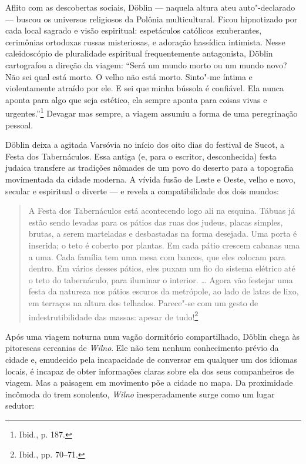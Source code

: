 Aflito com as descobertas sociais, Döblin --- naquela altura ateu
auto"-declarado --- buscou os universos religiosos da Polônia
multicultural. Ficou hipnotizado por cada local sagrado e visão
espiritual: espetáculos católicos exuberantes, cerimônias ortodoxas
russas misteriosas, e adoração hassídica intimista. Nesse caleidoscópio
de pluralidade espiritual frequentemente antagonista, Döblin cartografou
a direção da viagem: ``Será um mundo morto ou um mundo novo? Não sei
qual está morto. O velho não está morto. Sinto"-me íntima e violentamente
atraído por ele. E sei que minha bússola é confiável. Ela nunca aponta
para algo que seja estético, ela sempre aponta para coisas vivas e
urgentes.''\footnote{Ibid., p. 187.} Devagar mas sempre, a viagem
assumiu a forma de uma peregrinação pessoal.

Döblin deixa a agitada Varsóvia no início dos oito dias do festival de
Sucot, a Festa dos Tabernáculos. Essa antiga (e, para o escritor,
desconhecida) festa judaica transfere as tradições nômades de um povo do
deserto para a topografia movimentada da cidade moderna. A vívida fusão
de Leste e Oeste, velho e novo, secular e espiritual o diverte --- e
revela a compatibilidade dos dois mundos:

\begin{quote}
A Festa dos Tabernáculos está acontecendo logo ali na esquina. Tábuas já
estão sendo levadas para os pátios das ruas dos judeus, placas simples,
brutas, a serem marteladas e desbastadas na forma desejada. Uma porta é
inserida; o teto é coberto por plantas. Em cada pátio crescem cabanas
uma a uma. Cada família tem uma mesa com bancos, que eles colocam para
dentro. Em vários desses pátios, eles puxam um fio do sistema elétrico
até o teto do tabernáculo, para iluminar o interior. \ldots{} Agora vão
festejar uma festa da natureza nos pátios escuros da metrópole, ao lado
de latas de lixo, em terraços na altura dos telhados. Parece"-se com um
gesto de indestrutibilidade das massas: apesar de tudo!\footnote{Ibid., pp. 70--71.} 
\end{quote}

Após uma viagem noturna num vagão dormitório compartilhado, Döblin chega
às pitorescas cercanias de \textit{Wilno}. Ele não tem nenhum conhecimento prévio
da cidade e, emudecido pela incapacidade de conversar em qualquer um dos
idiomas locais, é incapaz de obter informações claras sobre ela dos seus
companheiros de viagem. Mas a paisagem em movimento põe a cidade no
mapa. Da proximidade incômoda do trem sonolento, \textit{Wilno} inesperadamente
surge como um lugar sedutor:

